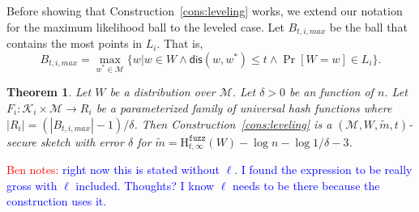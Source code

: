 \documentclass[11pt]{article}
\newcommand{\consref}[1]{\mbox{Construction~\ref{#1}}}
\newcommand{\dis}{\ensuremath{\mathsf{dis}}}
\newcommand{\Hfuzz}{\mathrm{H}^{\mathtt{fuzz}}_{t,\infty}}
\newtheorem{theorem}{Theorem}[section]
\newcommand{\authnote}[2]{{\textcolor{red}{\textsf{#1 notes: }\textcolor{blue}{ #2}}\marginpar{\textcolor{red}{\textbf{!!!!!}}}}}
\newcommand{\authnote}[2]{}
\newcommand{\bnote}[1]{{\authnote{Ben}{#1}}}
\begin{document}
\noindent Before showing that \consref{cons:leveling} works, we extend our notation for the maximum likelihood ball to the leveled case.  Let $B_{t, i, max}$ be the ball that contains the most points in $L_i$.  That is,
\[
B_{t, i, max} = \max_{w^* \in \mathcal{M}} \{w | w\in W \wedge \dis(w, w^*)\le t \wedge \Pr[W=w]\in L_i\}.
\]
\begin{theorem}
\label{thm:layered hashing}
Let $W$ be a distribution over $\mathcal{M}$.  Let $\delta>0$ be an function of $n$.  Let $F_i: \mathcal{K}_i \times \mathcal{M}\rightarrow R_i$ be a parameterized family of universal hash functions where $|R_i| = (|B_{t, i, max}|-1) /\delta$.  Then \consref{cons:leveling} is a $(\mathcal{M}, W, \tilde{m}, t)$-secure sketch with error $\delta$ for $\tilde{m} = \Hfuzz(W) - \log n - \log 1/\delta - 3$.
\end{theorem}
\bnote{right now this is stated without $\ell$.  I found the expression to be really gross with $\ell$ included.  Thoughts?  I know $\ell$ needs to be there because the construction uses it.}
\end{document}
